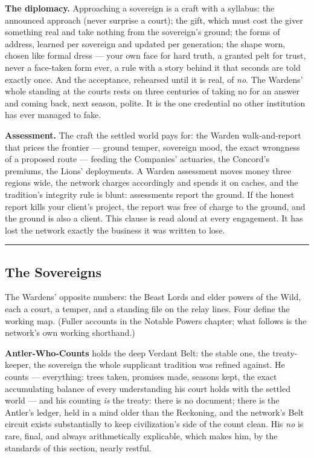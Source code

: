 \textbf{The diplomacy.} Approaching a sovereign is a craft with a syllabus: the announced approach (never surprise a court); the gift, which must cost the giver something real and take nothing from the sovereign's ground; the forms of address, learned per sovereign and updated per generation; the shape worn, chosen like formal dress --- your own face for hard truth, a granted pelt for trust, never a face-taken form ever, a rule with a story behind it that seconds are told exactly once. And the acceptance, rehearsed until it is real, of \textit{no}. The Wardens' whole standing at the courts rests on three centuries of taking no for an answer and coming back, next season, polite. It is the one credential no other institution has ever managed to fake.

\textbf{Assessment.} The craft the settled world pays for: the Warden walk-and-report that prices the frontier --- ground temper, sovereign mood, the exact wrongness of a proposed route --- feeding the Companies' actuaries, the Concord's premiums, the Lions' deployments. A Warden assessment moves money three regions wide, the network charges accordingly and spends it on caches, and the tradition's integrity rule is blunt: assessments report the ground. If the honest report kills your client's project, the report was free of charge to the ground, and the ground is also a client. This clause is read aloud at every engagement. It has lost the network exactly the business it was written to lose.

\medskip\hrule\medskip

\subsection{The Sovereigns}

The Wardens' opposite numbers: the Beast Lords and elder powers of the Wild, each a court, a temper, and a standing file on the relay lines. Four define the working map. (Fuller accounts in the Notable Powers chapter; what follows is the network's own working shorthand.)

\textbf{Antler-Who-Counts} holds the deep Verdant Belt: the stable one, the treaty-keeper, the sovereign the whole supplicant tradition was refined against. He counts --- everything: trees taken, promises made, seasons kept, the exact accumulating balance of every understanding his court holds with the settled world --- and his counting \textit{is} the treaty: there is no document; there is the Antler's ledger, held in a mind older than the Reckoning, and the network's Belt circuit exists substantially to keep civilization's side of the count clean. His \textit{no} is rare, final, and always arithmetically explicable, which makes him, by the standards of this section, nearly restful.

